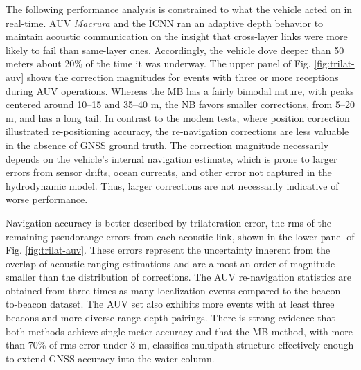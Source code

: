 \documentclass[preprint,TurnOnLineNumbers]{JASA}
\begin{document}
The following performance analysis is constrained to what the vehicle acted on in real-time.
AUV \emph{Macrura} and the ICNN ran an adaptive depth behavior to maintain acoustic communication on the insight that cross-layer links were more likely to fail than same-layer ones.
Accordingly, the vehicle dove deeper than 50 meters about 20\% of the time it was underway.
The upper panel of Fig. \ref{fig:trilat-auv} shows the correction magnitudes for events with three or more receptions during AUV operations.
Whereas the MB has a fairly bimodal nature, with peaks centered around 10--15 and 35--40 m, the NB favors smaller corrections, from 5--20 m, and has a long tail.
In contrast to the modem tests, where position correction illustrated re-positioning accuracy, the re-navigation corrections are less valuable in the absence of GNSS ground truth.
The correction magnitude necessarily depends on the vehicle's internal navigation estimate, which is prone to larger errors from sensor drifts, ocean currents, and other error not captured in the hydrodynamic model.
Thus, larger corrections are not necessarily indicative of worse performance.

Navigation accuracy is better described by trilateration error, the rms of the remaining pseudorange errors from each acoustic link, shown in the lower panel of Fig. \ref{fig:trilat-auv}.
These errors represent the uncertainty inherent from the overlap of acoustic ranging estimations and are almost an order of magnitude smaller than the distribution of corrections.
The AUV re-navigation statistics are obtained from three times as many localization events compared to the beacon-to-beacon dataset.
The AUV set also exhibits more events with at least three beacons and more diverse range-depth pairings.
There is strong evidence that both methods achieve single meter accuracy and that the MB method, with more than 70\% of rms error under 3 m, classifies multipath structure effectively enough to extend GNSS accuracy into the water column.
\end{document}

